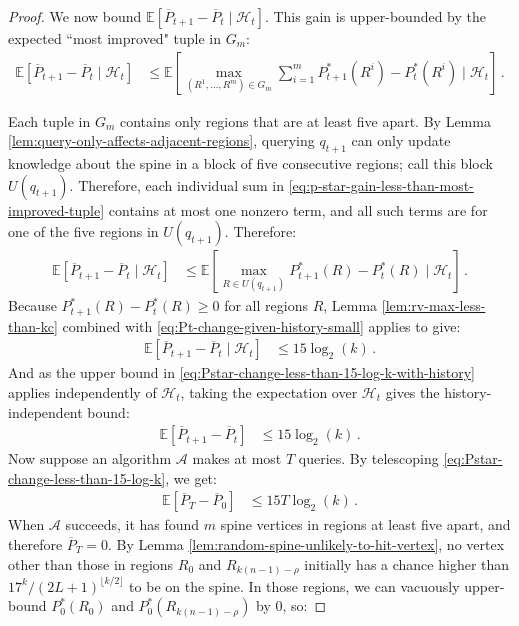 \documentclass[11pt]{article}
\begin{document}
\begin{proof}
We now bound $\mathbb{E} [\overline{P}_{t+1} - \overline{P}_t \mid \mathcal{H}_t]$. This gain is upper-bounded by the expected ``most improved" tuple in $G_m$:
\begin{align}
    \mathbb{E} [\overline{P}_{t+1} - \overline{P}_t \mid \mathcal{H}_t] &\leq \mathbb{E} \left[ \max_{(R^1, \ldots, R^m) \in G_m} \sum_{i=1}^m P^*_{t+1}(R^i) - P^*_t(R^i) \mid \mathcal{H}_t\right] \,.  \label{eq:p-star-gain-less-than-most-improved-tuple}
\end{align}

Each tuple in $G_m$ contains only regions that are at least five apart. By Lemma \ref{lem:query-only-affects-adjacent-regions}, querying $q_{t+1}$ can only update knowledge about the spine in a block of five consecutive regions; call this block $U(q_{t+1})$. Therefore, each individual sum in \eqref{eq:p-star-gain-less-than-most-improved-tuple} contains at most one nonzero term, and all such terms are for one of the five regions in $U(q_{t+1})$. Therefore:
\begin{align}
    \mathbb{E} [\overline{P}_{t+1} - \overline{P}_t \mid \mathcal{H}_t] &\leq \mathbb{E} \left[ \max_{R \in U(q_{t+1})} P^*_{t+1}(R) - P^*_t(R) \mid \mathcal{H}_t\right] \,. 
\end{align}
Because $P^*_{t+1}(R) - P^*_t(R) \geq 0$ for all regions $R$, Lemma \ref{lem:rv-max-less-than-kc} combined with \eqref{eq:Pt-change-given-history-small} applies to give:
\begin{align}
    \mathbb{E} [\overline{P}_{t+1} - \overline{P}_t \mid \mathcal{H}_t] &\leq 15 \log_2(k) \,. \label{eq:Pstar-change-less-than-15-log-k-with-history}
\end{align}
And as the upper bound in \eqref{eq:Pstar-change-less-than-15-log-k-with-history} applies independently of $\mathcal{H}_t$, taking the expectation over $\mathcal{H}_t$ gives the history-independent bound:
\begin{align}
    \mathbb{E} [\overline{P}_{t+1} - \overline{P}_t] &\leq 15 \log_2(k)\,.  \label{eq:Pstar-change-less-than-15-log-k}
\end{align}
Now suppose an algorithm $\mathcal{A}$ makes at most $T$ queries. By telescoping \eqref{eq:Pstar-change-less-than-15-log-k}, we get:
\begin{align}
    \mathbb{E} [\overline{P}_T - \overline{P}_0] &\leq 15 T \log_2(k) \,.
\end{align}
When $\mathcal{A}$ succeeds, it has found $m$ spine vertices in regions at least five apart, and therefore $\overline{P}_T = 0$. By Lemma \ref{lem:random-spine-unlikely-to-hit-vertex}, no vertex other than those in regions $R_0$ and $R_{k(n-1)-\rho}$ initially has a chance higher than $17^k / (2L+1)^{\lfloor k/2 \rfloor}$ to be on the spine. In those regions, we can vacuously upper-bound $P^*_0(R_0)$ and $P^*_0(R_{k(n-1)-\rho})$ by $0$, so:

\end{proof}
\end{document}
